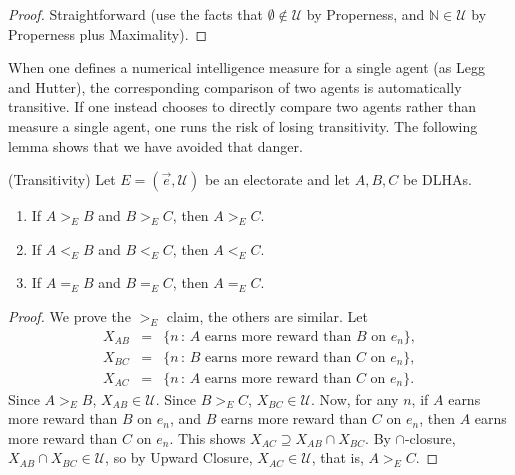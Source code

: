 \documentclass[twoside,11pt]{article}
\begin{document}
\begin{proof}
    Straightforward (use the facts that $\emptyset\not\in\mathscr U$ by Properness,
    and $\mathbb N\in\mathscr U$ by Properness plus Maximality).
\end{proof}

When one defines a numerical intelligence measure for a single agent (as Legg and Hutter),
the corresponding comparison of two agents is automatically transitive.
If one instead chooses to directly compare two agents rather than measure a single agent,
one runs the risk of losing transitivity. The following lemma shows that we have
avoided that danger.


\begin{lemma}
\label{transitivityLemma}
    (Transitivity)
    Let $E=(\vec{e},\mathscr U)$ be an electorate and let $A,B,C$ be DLHAs.
    \begin{enumerate}
        \item If $A>_{E}B$ and $B>_{E}C$, then $A>_{E}C$.
        \item If $A<_{E}B$ and $B<_{E}C$, then $A<_{E}C$.
        \item If $A=_{E}B$ and $B=_{E}C$, then $A=_{E}C$.
    \end{enumerate}
\end{lemma}

\begin{proof}
    We prove the $>_{E}$ claim, the others are similar.
    Let
    \begin{eqnarray*}
        X_{AB} &=& \{n\,:\,\mbox{$A$ earns more reward than $B$ on $e_n$}\},\\
        X_{BC} &=& \{n\,:\,\mbox{$B$ earns more reward than $C$ on $e_n$}\},\\
        X_{AC} &=& \{n\,:\,\mbox{$A$ earns more reward than $C$ on $e_n$}\}.
    \end{eqnarray*}
    Since $A>_{E}B$, $X_{AB}\in\mathscr U$.
    Since $B>_{E}C$, $X_{BC}\in\mathscr U$.
    Now, for any $n$, if $A$ earns more reward than $B$ on $e_n$,
    and $B$ earns more reward than $C$ on $e_n$,
    then $A$ earns more reward than $C$ on $e_n$.
    This shows $X_{AC}\supseteq X_{AB}\cap X_{BC}$.
    By $\cap$-closure, $X_{AB}\cap X_{BC}\in\mathscr U$,
    so by Upward Closure, $X_{AC}\in\mathscr U$, that is, $A>_{E}C$.
\end{proof}
\end{document}

